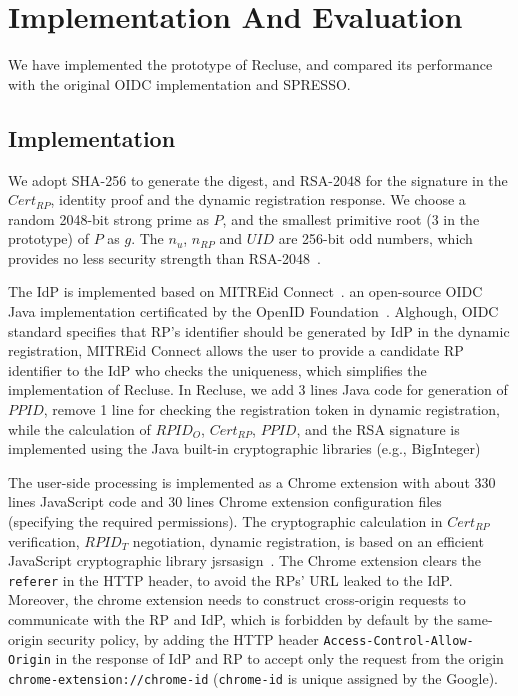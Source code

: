 \section{Implementation And Evaluation}
\label{sec:implementation}
We have implemented the prototype of Recluse, and compared its performance with the original OIDC implementation and SPRESSO.

\subsection{Implementation}
We adopt SHA-256 to generate the digest, and  RSA-2048 for the signature in  the $Cert_{RP}$, identity proof and the dynamic registration response. We  choose a random 2048-bit strong prime as $P$, and the smallest primitive root (3 in the prototype)  of $P$ as $g$. The  $n_u$, $n_{RP}$ and $UID$  are 256-bit odd numbers, which provides no less security strength than RSA-2048~\cite{barkerecommendation}.

The IdP is implemented based on MITREid Connect~\cite{MITREid}. an open-source OIDC Java implementation certificated by the OpenID Foundation~\cite{OIDF}. Alghough, OIDC standard specifies that RP's identifier should be generated by IdP in the dynamic registration, MITREid Connect allows the user to provide a candidate RP identifier to the IdP who checks the uniqueness, which simplifies the implementation of Recluse. In Recluse, we add 3 lines Java code for generation of $PPID$, remove 1 line for checking the registration token in dynamic registration, while the calculation of $RPID_O$, $Cert_{RP}$,  $PPID$, and the RSA signature is implemented using the Java built-in cryptographic libraries (e.g., BigInteger)

The user-side processing is implemented as a Chrome extension with about 330 lines JavaScript code and 30 lines  Chrome extension configuration files (specifying the required permissions). The cryptographic calculation in $Cert_{RP}$ verification, $RPID_T$ negotiation, dynamic registration, is based on an efficient JavaScript cryptographic library  jsrsasign~\cite{jsrsasign}. The Chrome extension clears the \verb+referer+ in the HTTP header, to avoid the RPs' URL leaked to the IdP. Moreover, the chrome extension needs to construct cross-origin requests to communicate with the RP and IdP, which is forbidden by default by the same-origin security policy, by adding the HTTP header \verb+Access-Control-Allow-Origin+ in the response of IdP and RP to accept only the request from the origin \verb+chrome-extension://chrome-id+ (\verb+chrome-id+ is unique assigned by the Google).


